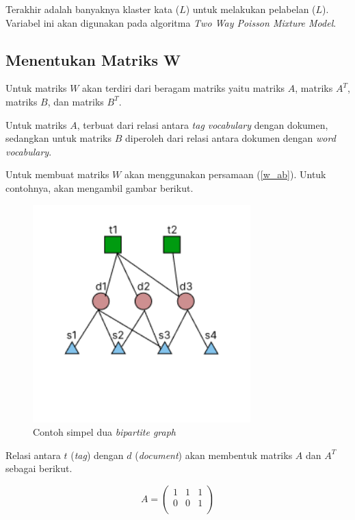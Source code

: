 Terakhir adalah banyaknya klaster kata ($L$) untuk melakukan pelabelan ($L$). Variabel ini akan digunakan pada algoritma \textit{Two Way Poisson Mixture Model}.

\subsection{Menentukan Matriks W}
Untuk matriks $W$ akan terdiri dari beragam matriks yaitu matriks $A$, matriks $A^T$, matriks $B$, dan matriks $B^T$.

Untuk matriks $A$, terbuat dari relasi antara \textit{tag vocabulary} dengan dokumen, sedangkan untuk matriks $B$ diperoleh dari relasi antara dokumen dengan \textit{word vocabulary}.

Untuk membuat matriks $W$ akan menggunakan persamaan (\ref{w_ab}). Untuk contohnya, akan mengambil gambar berikut.

\begin{figure}[h]
    \centering
    \includegraphics[width=0.75\textwidth]{gambar/Bipartite Graph Simple.png}
    \caption{Contoh simpel dua \textit{bipartite graph}}
    \label{gambar:simple_bipartite_graph}
\end{figure}

Relasi antara $t$ (\textit{tag}) dengan $d$ (\textit{document}) akan membentuk matriks $A$ dan $A^T$ sebagai berikut.

\begin{equation}
    A = \begin{pmatrix}
1 & 1 & 1 \\
0 & 0 & 1 \\
\end{pmatrix}
\end{equation}

